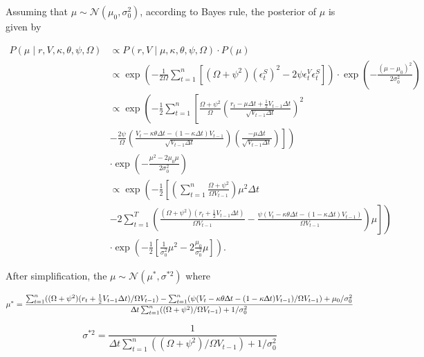 \documentclass[12pt,a4paper]{article}
\numberwithin{equation}{section}
\begin{document}
Assuming that $\mu \sim \mathcal{N}(\mu_0, \sigma_0^2)$, according to Bayes rule, the posterior of $\mu$ is given by

\begin{align*}
P(\mu \mid r, V, \kappa, \theta, \psi, \Omega) & \propto P(r, V \mid \mu, \kappa, \theta, \psi, \Omega) \cdot P(\mu) \\[0.6em]
& \propto \exp\left( -\frac{1}{2\Omega} \sum_{t=1}^{n} \left[ (\Omega + \psi^2)(\epsilon_t^S)^2 - 2\psi \epsilon_t^V \epsilon_t^S \right] \right) \cdot \exp\left( -\frac{(\mu - \mu_0)^2}{2\sigma_0^2} \right) \\[0.6em]
& \propto \exp\left( -\frac{1}{2} \sum_{t=1}^{n} \left[ \frac{\Omega + \psi^2}{\Omega} \left( \frac{r_t - \mu \Delta t + \frac{1}{2} V_{t-1} \Delta t}{\sqrt{V_{t-1} \Delta t}} \right)^2 \right. \right. \\[0.6em]
& \left. \left. - \frac{2\psi}{\Omega} \left( \frac{V_t - \kappa \theta \Delta t - (1 - \kappa \Delta t) V_{t-1}}{\sqrt{V_{t-1} \Delta t}} \right) \left( \frac{-\mu \Delta t}{\sqrt{V_{t-1} \Delta t}} \right) \right] \right) \\[0.6em]
& \cdot \exp\left( -\frac{\mu^2 - 2\mu_0 \mu}{2\sigma_0^2} \right)\\[0.6em]
& \propto\exp\left(-\frac{1}{2} \left[\left(\sum_{t=1}^n \frac{\Omega + \psi^2}{\Omega V_{t-1}}\right) \mu^2 \Delta t \right. \right. \\[0.6em] 
& \left. \left. - 2\sum_{t=1}^T \left(\frac{(\Omega + \psi^2)(r_t + \frac{1}{2} V_{t-1} \Delta t)}{\Omega V_{t-1}} - \frac{\psi \left(V_t - \kappa \theta \Delta t - (1 - \kappa \Delta t)V_{t-1} \right)}{\Omega V_{t-1}} \right) \mu \right] \right) \\[0.6em]
& \cdot \exp\left(-\frac{1}{2} \left[\frac{1}{\sigma_0^2} \mu^2 - 2 \frac{\mu_0}{\sigma_0^2} \mu \right] \right).
\end{align*}

After simplification, the $\mu \sim \mathcal{N}(\mu^*, \sigma^{*2})$ where 

\[
\mu^* = \frac{\sum_{t=1}^n ((\Omega + \psi^2) (r_t + \frac{1}{2} V_{t-1} \Delta t)/\Omega V_{t-1}) - \sum_{t=1}^n (\psi (V_t - \kappa \theta \Updelta t - (1 - \kappa \Updelta t)V_{t-1})/\Omega V_{t-1}) + \mu_0/\sigma_0^2}{\Updelta t \sum_{t=1}^n ((\Omega + \psi^2) / \Omega V_{t-1}) + 1 / \sigma_0^2}
\]

\[
\sigma^{*2} = \frac{1}{\Delta t \sum_{t=1}^n ((\Omega + \psi^2) / \Omega V_{t-1}) + 1 / \sigma_0^2}
\]
\end{document}
